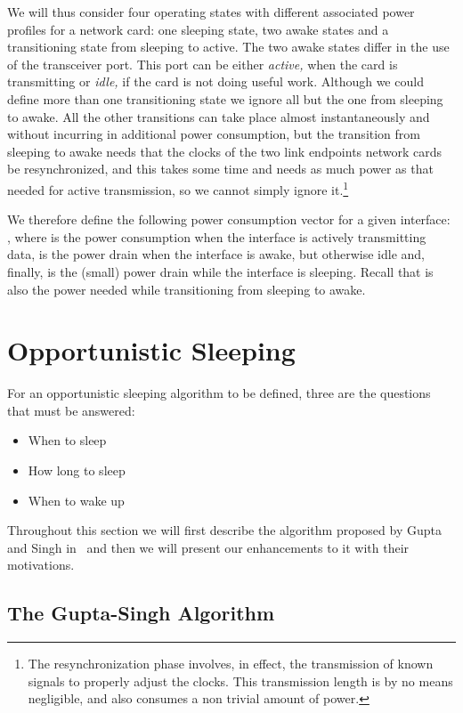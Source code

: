 \documentclass[conference,english]{IEEEtran}
\begin{document}
We will thus consider four operating states with different associated power
profiles for a network card: one sleeping state, two awake states and a
transitioning state from sleeping to active. The two awake states differ in
the use of the transceiver port. This port can be either \emph{active,} when
the card is transmitting or \emph{idle,} if the card is not doing useful work.
Although we could define more than one transitioning state we ignore all but
the one from sleeping to awake. All the other transitions can take place
almost instantaneously and without incurring in additional power consumption,
but the transition from sleeping to awake needs that the clocks of the two
link endpoints network cards be resynchronized, and this takes some time and
needs as much power as that needed for active transmission, so we cannot
simply ignore it.\footnote{The resynchronization phase involves, in effect,
  the transmission of known signals to properly adjust the clocks. This
  transmission length is by no means negligible, and also consumes a non
  trivial amount of power.}

We therefore define the following power consumption vector for a given
interface: , where
 is the power consumption when the interface is actively
transmitting data,  is the power drain when the interface is
awake, but otherwise idle and, finally,  is the (small) power
drain while the interface is sleeping. Recall that  is also
the power needed while transitioning from sleeping to awake.

\section{Opportunistic Sleeping}
\label{sec:opport-sleep}

For an opportunistic sleeping algorithm to be defined, three are the questions
that must be answered:
\begin{itemize}
\item When to sleep
\item How long to sleep
\item When to wake up
\end{itemize}

Throughout this section we will first describe the algorithm proposed by Gupta
and Singh in~\cite{gupta07:_using_low_power_modes_for} and then we will
present our enhancements to it with their motivations.

\subsection{The Gupta-Singh Algorithm}
\label{sec:gupta-singh-algor}
\end{document}
